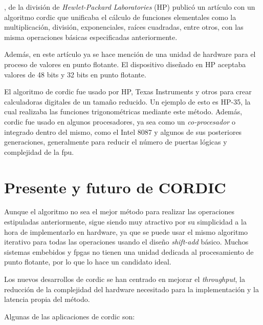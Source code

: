 \cite{walther_unified_1971}, de la división de \textit{Hewlet-Packard Laboratories} (HP) publicó un artículo con un algoritmo \gls{cordic} que unificaba el cálculo de funciones elementales como la multiplicación, división, exponenciales, raíces cuadradas, entre otros, con las misma operaciones básicas especificadas anteriormente.

Además, en este artículo ya se hace mención de una unidad de hardware para el proceso de valores en punto flotante. El dispositivo diseñado en HP aceptaba valores de 48 bits y 32 bits en punto flotante.

El algoritmo de \gls{cordic} fue usado por HP, Texas Instruments y otros para crear calculadoras digitales de un tamaño reducido. Un ejemplo de esto es HP-35, la cual realizaba las funciones trigonométricas mediante este método. Además, \gls{cordic} fue usado en algunos procesadores, ya sea como un \textit{co-procesador} o integrado dentro del mismo, como el Intel 8087 y algunos de sus posteriores generaciones, generalmente para reducir el número de puertas lógicas y complejidad de la \gls{fpu}.


\section{Presente y futuro de CORDIC}
Aunque el algoritmo no sea el mejor método para realizar las operaciones estipuladas anteriormente, sigue siendo muy atractivo por su simplicidad a la hora de implementarlo en hardware, ya que se puede usar el mismo algoritmo iterativo para todas las operaciones usando el diseño \textit{shift-add} básico. Muchos sistemas embebidos y \gls{fpga}s no tienen una unidad dedicada al procesamiento de punto flotante, por lo que lo hace un candidato ideal.

Los nuevos desarrollos de \gls{cordic} se han centrado en mejorar el \textit{throughput}, la reducción de la complejidad del hardware necesitado para la implementación y la latencia propia del método.

Algunas de las aplicaciones de \gls{cordic} son:

